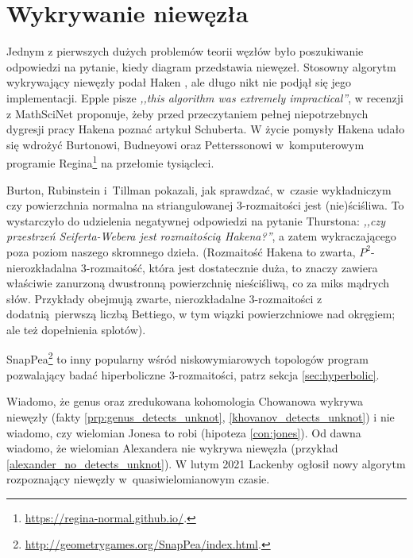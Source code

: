 
\section{Wykrywanie niewęzła}
Jednym z pierwszych dużych problemów teorii węzłów było poszukiwanie odpowiedzi na pytanie, kiedy diagram przedstawia niewęzeł.
%
Stosowny algorytm wykrywający niewęzły podał Haken \cite{haken1961}, ale długo nikt nie podjął się jego implementacji.
%
Epple pisze \emph{,,this algorithm was extremely impractical''}, w recenzji z MathSciNet proponuje, żeby przed przeczytaniem pełnej niepotrzebnych dygresji pracy Hakena poznać artykuł \cite{schubert1961} Schuberta.
%
%
W życie pomysły Hakena udało się wdrożyć Burtonowi, Budneyowi oraz Petterssonowi w~komputerowym programie Regina\footnote{\url{https://regina-normal.github.io/}.} na przełomie tysiącleci.

%
%
%

Burton, Rubinstein i~Tillman \cite{burton2012} pokazali, jak sprawdzać, w~czasie wykładniczym czy powierzchnia normalna na striangulowanej 3-rozmaitości jest (nie)ściśliwa.
%
%
To wystarczyło do udzielenia negatywnej odpowiedzi na pytanie Thurstona: \emph{,,czy przestrzeń Seiferta-Webera jest rozmaitością Hakena?''}, a zatem wykraczającego poza poziom naszego skromnego dzieła.
%
%
%
(Rozmaitość Hakena to zwarta, $P^2$-nierozkładalna 3-rozmaitość, która jest dostatecznie duża, to znaczy zawiera właściwie zanurzoną dwustronną powierzchnię nieściśliwą, co za miks mądrych słów. Przykłady obejmują zwarte, nierozkładalne 3-rozmaitości z dodatnią pierwszą liczbą Bettiego, w tym wiązki powierzchniowe nad okręgiem; ale też dopełnienia splotów).

SnapPea\footnote{\url{http://geometrygames.org/SnapPea/index.html}.} to inny popularny wśród niskowymiarowych topologów program pozwalający badać hiperboliczne 3-rozmaitości, patrz sekcja \ref{sec:hyperbolic}.

Wiadomo, że genus oraz zredukowana kohomologia Chowanowa wykrywa niewęzły (fakty \ref{prp:genus_detects_unknot}, \ref{khovanov_detects_unknot}) i nie wiadomo, czy wielomian Jonesa to robi (hipoteza \ref{con:jones}).
%
%
%
Od dawna wiadomo, że wielomian Alexandera nie wykrywa niewęzła (przykład \ref{alexander_no_detects_unknot}).
%
W lutym 2021 Lackenby ogłosił nowy algorytm rozpoznający niewęzły w~quasiwielomianowym czasie.
%

